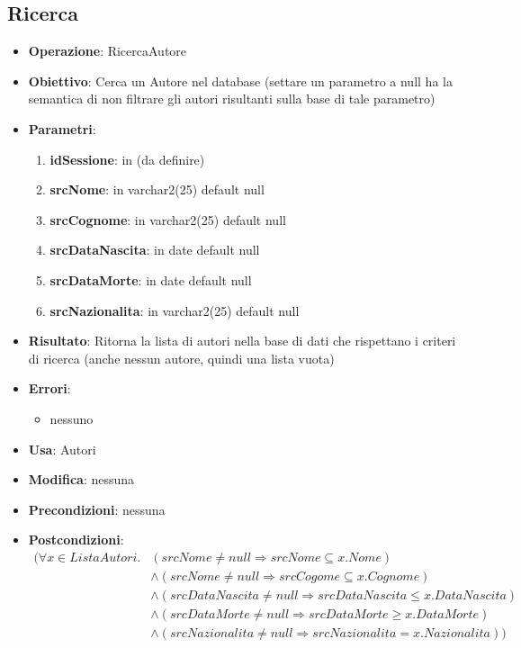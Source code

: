 \documentclass[a4paper,11pt]{article}
\begin{document}
\subsection{Ricerca}
\begin{itemize}
	\item \textbf{Operazione}: RicercaAutore
	\item \textbf{Obiettivo}: Cerca un Autore nel database (settare un parametro a null ha la semantica di non filtrare gli autori risultanti sulla base di tale parametro)
	\item \textbf{Parametri}:
	\begin{enumerate}
		\item \textbf{idSessione}: in (da definire)
		\item \textbf{srcNome}: in varchar2(25) default null
		\item \textbf{srcCognome}: in varchar2(25) default null
		\item \textbf{srcDataNascita}: in date default null
		\item \textbf{srcDataMorte}: in date default null
		\item \textbf{srcNazionalita}: in varchar2(25) default null
	\end{enumerate}
	\item \textbf{Risultato}: Ritorna la lista di autori nella base di dati che rispettano i criteri di ricerca (anche nessun autore, quindi una lista vuota)
	\item \textbf{Errori}: 
	\begin{itemize}
		\item nessuno
	\end{itemize}
	\item \textbf{Usa}: Autori
	\item \textbf{Modifica}: nessuna
	\item \textbf{Precondizioni}: nessuna
	\item \textbf{Postcondizioni}:
 	\begin{align*}
		(\forall x \in ListaAutori.
		& (srcNome \ne null \Rightarrow srcNome \subseteq x.Nome) \\
		& \land (srcNome \ne null \Rightarrow srcCogome \subseteq x.Cognome) \\
		& \land (srcDataNascita \ne null \Rightarrow srcDataNascita \le x.DataNascita) \\
		& \land (srcDataMorte \ne null \Rightarrow srcDataMorte \ge x.DataMorte) \\
		& \land (srcNazionalita \ne null \Rightarrow srcNazionalita = x.Nazionalita))
	\end{align*}
\end{itemize}
\end{document}
